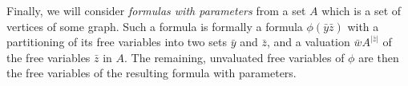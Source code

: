 Finally, we will consider \emph{formulas with parameters}
from a set  $A$ which is a set of vertices of some graph.
Such a formula is formally a formula $\phi(\bar y\bar z)$
with a partitioning of its free variables into two sets $\bar y$ and $\bar z$, and a valuation $\bar wA^{|\bar z|}$ of the free variables $\bar z$ in $A$.
The remaining, unvaluated free variables of $\phi$
are then the  free variables of the resulting formula with parameters. 



%


